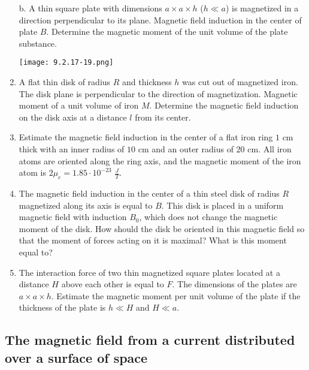 \documentclass{article}
\begin{document}
\begin{enumerate}[label=9.2.\arabic*]
b. A thin square plate with dimensions $a \times a \times h$ ($h \ll a$) is magnetized in a direction perpendicular to its plane. Magnetic field induction in the center of plate $B$. Determine the magnetic moment of the unit volume of the plate substance.

\begin{center}
    \texttt{[image: 9.2.17-19.png]}
\end{center}

\item A flat thin disk of radius $R$ and thickness $h$ was cut out of magnetized iron. The disk plane is perpendicular to the direction of magnetization. Magnetic moment of a unit volume of iron $M$. Determine the magnetic field induction on the disk axis at a distance $l$ from its center.

\item Estimate the magnetic field induction in the center of a flat iron ring $1$ cm thick with an inner radius of $10$ cm and an outer radius of $20$ cm. All iron atoms are oriented along the ring axis, and the magnetic moment of the iron atom is $2 \mu_e = 1.85 \cdot 10^{-23}$ $\frac{J}{T}$.

\item The magnetic field induction in the center of a thin steel disk of radius $R$ magnetized along its axis is equal to $B$. This disk is placed in a uniform magnetic field with induction $B_0$, which does not change the magnetic moment of the disk. How should the disk be oriented in this magnetic field so that the moment of forces acting on it is maximal? What is this moment equal to?

\item The interaction force of two thin magnetized square plates located at a distance $H$ above each other is equal to $F$. The dimensions of the plates are $a \times a \times h$. Estimate the magnetic moment per unit volume of the plate if the thickness of the plate is $h \ll H$ and $H \ll a$.


\end{enumerate}
\subsection{The magnetic field from a current distributed over a surface of space}
\end{document}
